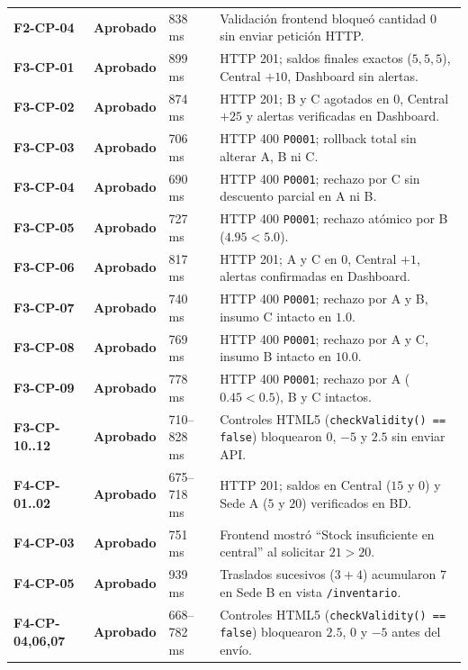 \documentclass[11pt,a4paper]{article}
\begin{document}
\begin{longtable}{p{1.8cm} p{2.0cm} p{1.6cm} p{9.6cm}}
\textbf{F2-CP-04} & \textbf{\textcolor{accentgreen}{Aprobado}} & 838 ms & Validación frontend bloqueó cantidad $0$ sin enviar petición HTTP. \\
\textbf{F3-CP-01} & \textbf{\textcolor{accentgreen}{Aprobado}} & 899 ms & HTTP 201; saldos finales exactos ($5,5,5$), Central $+10$, Dashboard sin alertas. \\
\textbf{F3-CP-02} & \textbf{\textcolor{accentgreen}{Aprobado}} & 874 ms & HTTP 201; B y C agotados en $0$, Central $+25$ y alertas verificadas en Dashboard. \\
\textbf{F3-CP-03} & \textbf{\textcolor{accentgreen}{Aprobado}} & 706 ms & HTTP 400 \texttt{P0001}; rollback total sin alterar A, B ni C. \\
\textbf{F3-CP-04} & \textbf{\textcolor{accentgreen}{Aprobado}} & 690 ms & HTTP 400 \texttt{P0001}; rechazo por C sin descuento parcial en A ni B. \\
\textbf{F3-CP-05} & \textbf{\textcolor{accentgreen}{Aprobado}} & 727 ms & HTTP 400 \texttt{P0001}; rechazo atómico por B ($4.95 < 5.0$). \\
\textbf{F3-CP-06} & \textbf{\textcolor{accentgreen}{Aprobado}} & 817 ms & HTTP 201; A y C en $0$, Central $+1$, alertas confirmadas en Dashboard. \\
\textbf{F3-CP-07} & \textbf{\textcolor{accentgreen}{Aprobado}} & 740 ms & HTTP 400 \texttt{P0001}; rechazo por A y B, insumo C intacto en $1.0$. \\
\textbf{F3-CP-08} & \textbf{\textcolor{accentgreen}{Aprobado}} & 769 ms & HTTP 400 \texttt{P0001}; rechazo por A y C, insumo B intacto en $10.0$. \\
\textbf{F3-CP-09} & \textbf{\textcolor{accentgreen}{Aprobado}} & 778 ms & HTTP 400 \texttt{P0001}; rechazo por A ($0.45 < 0.5$), B y C intactos. \\
\textbf{F3-CP-10..12} & \textbf{\textcolor{accentgreen}{Aprobado}} & 710--828 ms & Controles HTML5 (\texttt{checkValidity() == false}) bloquearon $0$, $-5$ y $2.5$ sin enviar API. \\
\textbf{F4-CP-01..02} & \textbf{\textcolor{accentgreen}{Aprobado}} & 675--718 ms & HTTP 201; saldos en Central ($15$ y $0$) y Sede A ($5$ y $20$) verificados en BD. \\
\textbf{F4-CP-03} & \textbf{\textcolor{accentgreen}{Aprobado}} & 751 ms & Frontend mostró ``Stock insuficiente en central'' al solicitar $21 > 20$. \\
\textbf{F4-CP-05} & \textbf{\textcolor{accentgreen}{Aprobado}} & 939 ms & Traslados sucesivos ($3+4$) acumularon $7$ en Sede B en vista \texttt{/inventario}. \\
\textbf{F4-CP-04,06,07} & \textbf{\textcolor{accentgreen}{Aprobado}} & 668--782 ms & Controles HTML5 (\texttt{checkValidity() == false}) bloquearon $2.5$, $0$ y $-5$ antes del envío. \\
\end{longtable}
\end{document}
